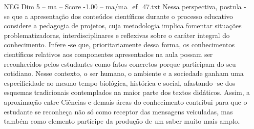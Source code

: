 \begin{textsample}{NEG Dim 5 – ma – Score -1.00 – ma/ma\_ef\_47.txt}
Nessa perspectiva, postula -se que a apresentação dos conteúdos científicos durante o processo educativo considere a pedagogia de projetos, cuja metodologia implica fomentar situações problematizadoras, interdisciplinares e reflexivas sobre o caráter integral do conhecimento.
Infere -se que, prioritariamente dessa forma, os conhecimentos científicos relativos aos componentes apresentados na aula possam ser reconhecidos pelos estudantes como fatos concretos porque participam do seu cotidiano.
Nesse contexto, o ser humano, o ambiente e a sociedade ganham uma especificidade ao mesmo tempo biológica, histórica e social, afastando -se dos esquemas tradicionais contemplados na maior parte dos textos didáticos.
Assim, a aproximação entre Ciências e demais áreas do conhecimento contribui para que o estudante se reconheça não só como receptor das mensagens veiculadas, mas também como elemento partícipe da produção de um saber muito mais amplo.

\end{textsample}
